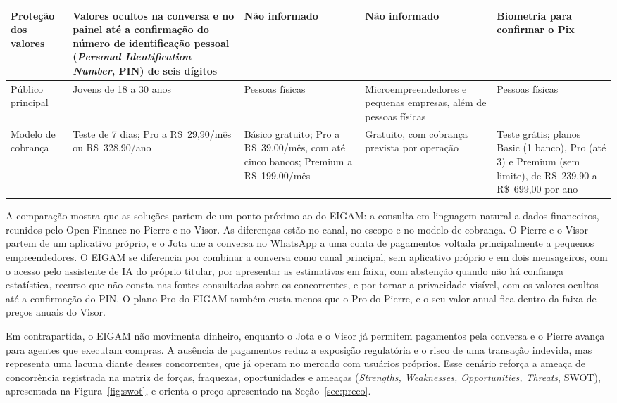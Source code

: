 {\begin{longtable}{|L{2.45cm}|L{3cm}|L{3cm}|L{3cm}|L{3cm}|}
Proteção dos valores &
Valores ocultos na conversa e no painel até a confirmação do número de identificação pessoal (\textit{Personal Identification Number}, PIN) de seis dígitos &
Não informado &
Não informado &
Biometria para confirmar o Pix \\ \hline

Público principal &
Jovens de 18 a 30 anos &
Pessoas físicas &
Microempreendedores e pequenas empresas, além de pessoas físicas &
Pessoas físicas \\ \hline

Modelo de cobrança &
Teste de 7 dias; Pro a R\$~29,90/mês ou R\$~328,90/ano &
Básico gratuito; Pro a R\$~39,00/mês, com até cinco bancos; Premium a R\$~199,00/mês &
Gratuito, com cobrança prevista por operação &
Teste grátis; planos Basic (1 banco), Pro (até 3) e Premium (sem limite), de R\$~239,90 a R\$~699,00 por ano \\ \hline

\end{longtable}
}

A comparação mostra que as soluções partem de um ponto próximo ao do EIGAM: a consulta em linguagem natural a dados financeiros, reunidos pelo Open Finance no Pierre e no Visor. As diferenças estão no canal, no escopo e no modelo de cobrança. O Pierre e o Visor partem de um aplicativo próprio, e o Jota une a conversa no WhatsApp a uma conta de pagamentos voltada principalmente a pequenos empreendedores. O EIGAM se diferencia por combinar a conversa como canal principal, sem aplicativo próprio e em dois mensageiros, com o acesso pelo assistente de IA do próprio titular, por apresentar as estimativas em faixa, com abstenção quando não há confiança estatística, recurso que não consta nas fontes consultadas sobre os concorrentes, e por tornar a privacidade visível, com os valores ocultos até a confirmação do PIN. O plano Pro do EIGAM também custa menos que o Pro do Pierre, e o seu valor anual fica dentro da faixa de preços anuais do Visor.

Em contrapartida, o EIGAM não movimenta dinheiro, enquanto o Jota e o Visor já permitem pagamentos pela conversa e o Pierre avança para agentes que executam compras. A ausência de pagamentos reduz a exposição regulatória e o risco de uma transação indevida, mas representa uma lacuna diante desses concorrentes, que já operam no mercado com usuários próprios. Esse cenário reforça a ameaça de concorrência registrada na matriz de forças, fraquezas, oportunidades e ameaças (\textit{Strengths, Weaknesses, Opportunities, Threats}, SWOT), apresentada na Figura~\ref{fig:swot}, e orienta o preço apresentado na Seção~\ref{sec:preco}.

